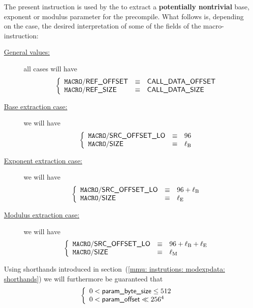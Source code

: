 The present instruction is used by the \hubMod{} to extract a \textbf{potentially nontrivial} base, exponent or modulus parameter for the  precompile.
What follows is, depending on the case, the desired interpretation of some of the fields of the macro-instruction:
\begin{description}
	\item[\underline{General values:}]
		all cases will have
		\[
			\left\{ \begin{array}{lcl}
				\texttt{MACRO}\textsf{/}{\textsf{REF\_OFFSET}}  & \equiv & \textsf{CALL\_DATA\_OFFSET} \\
				\texttt{MACRO}\textsf{/}{\textsf{REF\_SIZE}}    & \equiv & \textsf{CALL\_DATA\_SIZE} \\
			\end{array} \right.
		\]
	\item[\underline{Base extraction case:}] 
		we will have
		\[
			\left\{ \begin{array}{lcl}
				\texttt{MACRO}\textsf{/}{\textsf{SRC\_OFFSET\_LO}}  & \equiv & 96            \\
				\texttt{MACRO}\textsf{/}{\textsf{SIZE}}         & \equiv & \ell_\text{B} \\
			\end{array} \right.
		\]
	\item[\underline{Exponent extraction case:}] 
		we will have
		\[
			\left\{ \begin{array}{lcl}
				\texttt{MACRO}\textsf{/}{\textsf{SRC\_OFFSET\_LO}}  & \equiv & 96 + \ell_\text{B} \\
				\texttt{MACRO}\textsf{/}{\textsf{SIZE}}         & \equiv & \ell_\text{E}      \\
			\end{array} \right.
		\]
	\item[\underline{Modulus extraction case:}] 
		we will have
		\[
			\left\{ \begin{array}{lcl}
				\texttt{MACRO}\textsf{/}{\textsf{SRC\_OFFSET\_LO}}  & \equiv & 96 + \ell_\text{B} + \ell_\text{E} \\
				\texttt{MACRO}\textsf{/}{\textsf{SIZE}}         & \equiv & \ell_\text{M}                      \\
			\end{array} \right.
		\]
\end{description}
Using shorthands introduced in section~(\ref{mmu: instrutions: modexpdata: shorthands}) we will furthermore be guaranteed that
\[
	\left\{ \begin{array}{l}
		0 < \textsf{param\_byte\_size} \leq 512    \\
		0 < \textsf{param\_offset}        \ll 256^4 \\
	\end{array} \right.
\]

